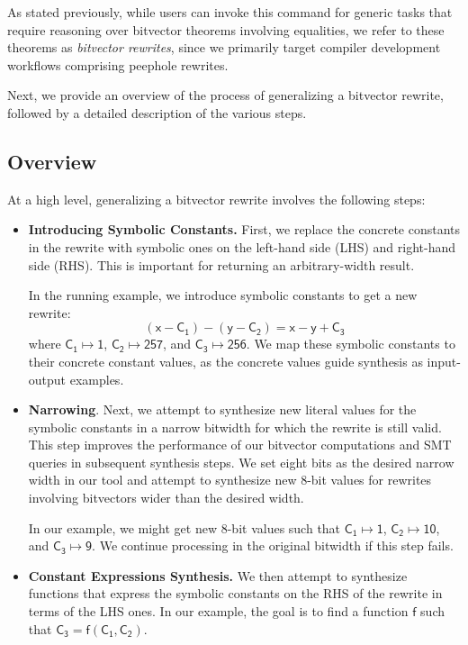 \documentclass[review, anonymous, acmsmall]{acmart}
\newcommand{\blockmath}[1]{\[\mathsf{#1}\]}
\newcommand{\inline}[1]{$\mathsf{#1}$}
\begin{document}
As stated previously, while users can invoke this command for generic tasks that require reasoning over bitvector theorems involving equalities, we refer to these theorems as \textit{bitvector rewrites}, since we primarily target compiler development workflows comprising peephole rewrites.

Next, we provide an overview of the process of generalizing a bitvector rewrite, followed by a detailed description of the various steps. 

\subsection{Overview}

At a high level, generalizing a bitvector rewrite involves the following steps:
\begin{itemize}
    \item \textbf{Introducing Symbolic Constants.} First, we replace the concrete constants in the rewrite with symbolic ones on the left-hand side (LHS) and right-hand side (RHS). This is important for returning an arbitrary-width result.  
    
    In the running example, we introduce symbolic constants to get a new rewrite:
                \blockmath{(x - C_1)  - (y - C_2)  = x - y + C_3}
    where \inline{C_1 \mapsto 1}, \inline{C_2 \mapsto 257}, and \inline{C_3 \mapsto 256}. We map these symbolic constants to their concrete constant values, as the concrete values guide synthesis as input-output examples.

    \item \textbf{Narrowing}. Next, we attempt to synthesize new literal values for the symbolic constants in a narrow bitwidth for which the rewrite is still valid. This step improves the performance of our bitvector computations and SMT queries in subsequent synthesis steps. We set eight bits as the desired narrow width in our tool and attempt to synthesize new 8-bit values for rewrites involving bitvectors wider than the desired width. 
    
    In our example, we might get new 8-bit values such that \inline{C_1 \mapsto 1}, \inline{C_2 \mapsto 10}, and \inline{C_3 \mapsto 9}. We continue processing in the original bitwidth if this step fails.
    
    \item \textbf{Constant Expressions Synthesis.} We then attempt to synthesize functions that express the symbolic constants on the RHS of the rewrite in terms of the LHS ones. In our example, the goal is to find a function \inline{f} such that \inline{C_3 = f(C_1, C_2)}. 
    

\end{itemize}
\end{document}
